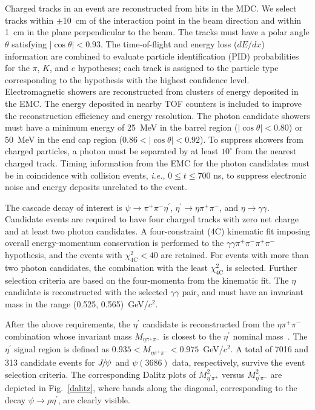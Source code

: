 \documentclass[twocolumn,showpacs,aps,prd]{revtex4-1}
\newcommand{\etap}{\eta^{\prime}}
\newcommand{\psip}{\psi(3686)}
\begin{document}
\section{}

Charged tracks in an event are reconstructed from hits in the MDC. We select tracks within $\pm$10~cm of the interaction
point in the beam direction and within 1~cm in the plane perpendicular to the beam. The tracks must have a polar angle $\theta$ satisfying
$|\cos\theta|<0.93$. The time-of-flight and energy loss ($dE/dx$) information are combined to evaluate particle identification (PID)
probabilities for the $\pi$, $K$, and $e$ hypotheses; each track is assigned to the particle type corresponding to the hypothesis
with the highest confidence level. Electromagnetic showers are reconstructed from clusters of energy deposited in the EMC. The energy
deposited in nearby TOF counters is included to improve the reconstruction efficiency and energy resolution. The photon candidate
showers must have a minimum energy of 25~MeV in the barrel region ($|\cos\theta|<0.80$) or 50~MeV in the end cap region ($0.86<|\cos\theta|<0.92$).
To suppress showers from charged particles, a photon must be separated by at least $10^\circ$ from the nearest charged track.
Timing information from the EMC for the photon candidates must be in coincidence with collision events, \textit{i.e.}, $0\leq t \leq 700$ ns, to suppress electronic noise and energy deposits unrelated to the event.

 The cascade decay of interest is $\psi \to \pi^{+} \pi^{-} \etap$, $\etap \to \eta \pi^{+} \pi^{-}$, and $\eta \to \gamma \gamma$. Candidate events are required to have four charged tracks with zero net charge and at least two photon candidates. A four-constraint (4C)
kinematic fit imposing overall energy-momentum conservation is performed to the $\gamma\gamma\pi^+\pi^-\pi^+\pi^-$ hypothesis, and the events with $\chi^2_{\mathrm{4C}}<40$ are retained. For events with more
than two photon candidates, the combination with the least $\chi^2_{\mathrm{4C}}$ is selected. Further selection criteria are based on the four-momenta from the kinematic fit. The $\eta$ candidate is reconstructed with the selected $\gamma\gamma$ pair, and must have an invariant mass in the range (0.525, 0.565)~GeV/$c^2$.

After the above requirements, the $\eta^\prime$ candidate is reconstructed from the $\eta\pi^{+}\pi^{-}$ combination whose invariant mass $M_{\eta \pi^{+} \pi^{-}}$ is closest to the $\etap$ nominal mass~\cite{pdg}. The $\eta^\prime$ signal
region is defined as $0.935<M_{\eta\pi^+\pi^-}< 0.975$~GeV/$c^2$. A total of 7016 and 313 candidate events for ${J\mskip -3mu/\mskip -2mu\psi\mskip 2mu}$ and $\psip$ data, respectively, survive the event selection
criteria. The corresponding Dalitz plots of $M^{2}_{\etap \pi^{+}}$ versus $M^{2}_{\etap \pi^{-}}$ are depicted in Fig.~\ref{dalitz}, where bands along the diagonal, corresponding to the decay $\psi \to \rho \etap$, are clearly visible.
\end{document}
